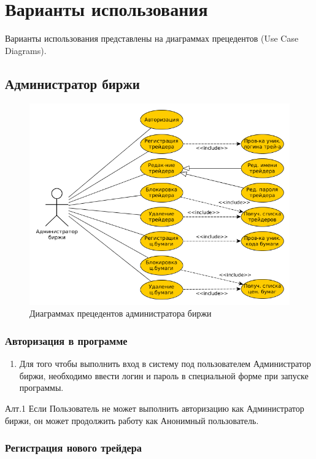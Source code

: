 \documentclass[a4paper, 12pt]{article}        %
\begin{document}
\newpage
\section{Варианты использования}

Варианты использования представлены на диаграммах прецедентов (Use Case Diagrams).

\subsection{Администратор биржи}

\begin{figure}[h!]
\centering
\includegraphics[scale=0.7]{res/pic01}
\caption{Диаграммах прецедентов администратора биржи}
\end{figure}

\subsubsection{Авторизация в программе}

\begin{enumerate}
\item Для того чтобы выполнить вход в систему под пользователем Администратор биржи, необходимо ввести логин и пароль в специальной форме при запуске программы.
\end{enumerate}

Алт.1 Если Пользователь не может выполнить авторизацию как Администратор биржи, он может продолжить работу как Анонимный пользователь.

\subsubsection{Регистрация нового трейдера}
\end{document}
